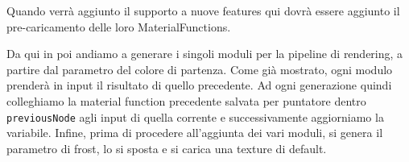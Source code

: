 \documentclass[main.tex]{subfiles}
\begin{document}
Quando verrà aggiunto il supporto a nuove features qui dovrà essere aggiunto il pre-caricamento delle loro MaterialFunctions.
\newline

Da qui in poi andiamo a generare i singoli moduli per la pipeline di rendering, a partire dal parametro del colore di partenza. Come già mostrato, ogni modulo prenderà in input il risultato di quello precedente. Ad ogni generazione quindi colleghiamo la material function precedente salvata per puntatore dentro \lstinline{previousNode} agli input di quella corrente e successivamente aggiorniamo la variabile. Infine, prima di procedere all'aggiunta dei vari moduli, si genera il parametro di frost, lo si sposta e si carica una texture di default.
% 
%
%
\end{document}

